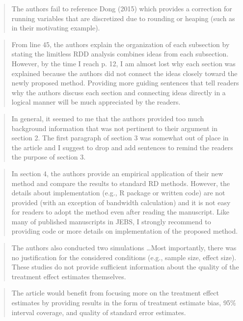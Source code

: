 \documentclass[12pt]{article}
\begin{document}
\begin{quote}
The authors fail to reference Dong (2015) which provides a correction
for running variables that are discretized due to rounding or heaping
(such as in their motivating example).
\end{quote}

\begin{quote}
From line 45, the authors explain the organization of each subsection
by stating the limitless RDD analysis combines ideas from each
subsection. However, by the time I reach p. 12, I am almost lost why
each section was explained because the authors did not connect the
ideas closely toward the newly proposed method. Providing more guiding
sentences that tell readers why the authors discuss each section and
connecting ideas directly in a logical manner will be much appreciated
by the readers.
\end{quote}

\begin{quote}
In general, it seemed to me that the authors provided too much
background information that was not pertinent to their argument in
section 2. The first paragraph of section 3 was somewhat out of place
in the article and I suggest to drop and add sentences to remind the
readers the purpose of section 3.
\end{quote}

\begin{quote}
In section 4, the authors provide an empirical application of their
new method and compare the results to standard RD methods. However,
the details about implementation (e.g., R package or written code) are
not provided (with an exception of bandwidth calculation) and it is
not easy for readers to adopt the method even after reading the
manuscript. Like many of published manuscripts in JEBS, I strongly
recommend to providing code or more details on implementation of the
proposed method.
\end{quote}

\begin{quote}
The authors also conducted two simulations \dots Most importantly, there was no justification for the considered
conditions (e.g., sample size, effect size). These studies do not
provide sufficient information about the quality of the treatment
effect estimates themselves.
\end{quote}

\begin{quote}
The article would benefit from focusing more on the treatment effect
estimates by providing results in the form of treatment estimate bias,
95\% interval coverage, and quality of standard error estimates.
\end{quote}
\end{document}
